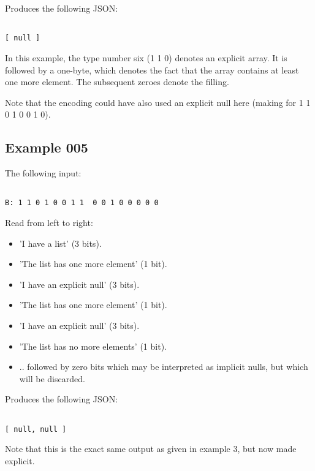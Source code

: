 Produces the following JSON:

\begin{changemargin}{-60mm}{0mm}
\begin{myquote}
\begin{verbatim}

[ null ]

\end{verbatim}
\end{myquote}
\end{changemargin}

In this example, the type number six (1 1 0) denotes an explicit array.
It is followed by a one-byte, which denotes the fact that the array
contains at least one more element. The subsequent zeroes denote the filling.

Note that the encoding could have also used an explicit null here
(making for 1 1 0 1  0 0 1 0).

\subsection{Example 005}

The following input:

\begin{changemargin}{-60mm}{0mm}
\begin{myquote}
\begin{verbatim}

B: 1 1 0 1 0 0 1 1  0 0 1 0 0 0 0 0

\end{verbatim}
\end{myquote}
\end{changemargin}

Read from left to right:
\begin{itemize}
\item 'I have a list' (3 bits).
\item 'The list has one more element' (1 bit).
\item 'I have an explicit null' (3 bits).
\item 'The list has one more element' (1 bit).
\item 'I have an explicit null' (3 bits).
\item 'The list has no more elements' (1 bit).
\item .. followed by zero bits which may be interpreted as implicit
      nulls, but which will be discarded.
\end{itemize}

Produces the following JSON:

\begin{changemargin}{-60mm}{0mm}
\begin{myquote}
\begin{verbatim}

[ null, null ]

\end{verbatim}
\end{myquote}
\end{changemargin}

Note that this is the exact same output as given in example 3, but now
made explicit.
